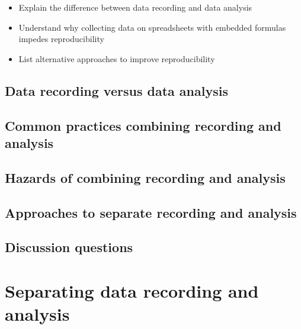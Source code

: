 \documentclass[]{tufte-book}
\providecommand{\tightlist}{%
  \setlength{\itemsep}{0pt}\setlength{\parskip}{0pt}}
\begin{document}
\begin{itemize}
\tightlist
\item
  Explain the difference between data recording and data analysis
\item
  Understand why collecting data on spreadsheets with embedded formulas impedes
  reproducibility
\item
  List alternative approaches to improve reproducibility
\end{itemize}

\hypertarget{data-recording-versus-data-analysis-9}{%
\subsection{Data recording versus data analysis}\label{data-recording-versus-data-analysis-9}}

\hypertarget{common-practices-combining-recording-and-analysis-9}{%
\subsection{Common practices combining recording and analysis}\label{common-practices-combining-recording-and-analysis-9}}

\hypertarget{hazards-of-combining-recording-and-analysis-9}{%
\subsection{Hazards of combining recording and analysis}\label{hazards-of-combining-recording-and-analysis-9}}

\hypertarget{approaches-to-separate-recording-and-analysis-9}{%
\subsection{Approaches to separate recording and analysis}\label{approaches-to-separate-recording-and-analysis-9}}

\hypertarget{discussion-questions-9}{%
\subsection{Discussion questions}\label{discussion-questions-9}}

\hypertarget{separating-data-recording-and-analysis-10}{%
\section{Separating data recording and analysis}\label{separating-data-recording-and-analysis-10}}
\end{document}
